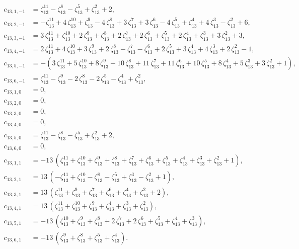 \documentclass[12pt]{amsart}
\theoremstyle{definition}
\theoremstyle{remark}
\numberwithin{equation}{section}
\begin{document}
\begin{align*}
c_{13,1,-1} &= \zeta_{13}^{11}-\zeta_{13}^{8}-\zeta_{13}^{5}+\zeta_{13}^{2}+2,
\\
c_{13,2,-1} &= -\zeta_{13}^{11}+4\, \zeta_{13}^{10}+\zeta_{13}^{9}-4\, \zeta_{13}^{8}+3\, \zeta_{13}^{7}+3\, \zeta_{13}^{6}-4\, \zeta_{13}^{5}+\zeta_{13}^{4}+4\, \zeta_{13}^{3}-\zeta_{13}^{2}+6,
\\
c_{13,3,-1} &= 3\, \zeta_{13}^{11}+\zeta_{13}^{10}+2\, \zeta_{13}^{9}+\zeta_{13}^{8}+2\, \zeta_{13}^{7}+2\, \zeta_{13}^{6}+\zeta_{13}^{5}+2\, \zeta_{13}^{4}+\zeta_{13}^{3}+3\, \zeta_{13}^{2}+3,
\\
c_{13,4,-1} &= 2\, \zeta_{13}^{11}+4\, \zeta_{13}^{10}+3\, \zeta_{13}^{9}+2\, \zeta_{13}^{8}-\zeta_{13}^{7}-\zeta_{13}^{6}+2\, \zeta_{13}^{5}+3\, \zeta_{13}^{4}+4\, \zeta_{13}^{3}+2\, \zeta_{13}^{2}-1,
\\
c_{13,5,-1} &= -(3\, \zeta_{13}^{11}+5\, \zeta_{13}^{10}+8\, \zeta_{13}^{9}+10\, \zeta_{13}^{8}+11\, \zeta_{13}^{7}+11\, \zeta_{13}^{6}+10\, \zeta_{13}^{5}+8\, \zeta_{13}^{4}+5\, \zeta_{13}^{3}+3\, \zeta_{13}^{2}+1),
\\
c_{13,6,-1} &= \zeta_{13}^{11}-\zeta_{13}^{9}-2\, \zeta_{13}^{8}-2\, \zeta_{13}^{5}-\zeta_{13}^{4}+\zeta_{13}^{2},
\\
c_{13,1,0} &= 0,
\\
c_{13,2,0} &= 0,
\\
c_{13,3,0} &= 0,
\\
c_{13,4,0} &= 0,
\\
c_{13,5,0} &= \zeta_{13}^{11}-\zeta_{13}^{8}-\zeta_{13}^{5}+\zeta_{13}^{2}+2,
\\
c_{13,6,0} &= 0,
\\
c_{13,1,1} &= -13\, (\zeta_{13}^{11}+\zeta_{13}^{10}+ \zeta_{13}^{9}+ \zeta_{13}^{8}+ \zeta_{13}^{7}+ \zeta_{13}^{6}+ \zeta_{13}^{5}+ \zeta_{13}^{4}+ \zeta_{13}^{3}+ \zeta_{13}^{2}+ 1),
\\
c_{13,2,1} &= 13\, (-\zeta_{13}^{11}+ \zeta_{13}^{10}- \zeta_{13}^{8}-\zeta_{13}^{5}+ \zeta_{13}^{3}- \zeta_{13}^{2}+1),
\\
c_{13,3,1} &= 13\, (\zeta_{13}^{11}+ \zeta_{13}^{9}+ \zeta_{13}^{7}+ \zeta_{13}^{6}+\zeta_{13}^{4}+ \zeta_{13}^{2}+2),
\\
c_{13,4,1} &= 13\, (\zeta_{13}^{11}+ \zeta_{13}^{10}+ \zeta_{13}^{9}+ \zeta_{13}^{4}+ \zeta_{13}^{3}+ \zeta_{13}^{2}),
\\
c_{13,5,1} &= -13\, (\zeta_{13}^{10}+\zeta_{13}^{9}+ \zeta_{13}^{8}+2\, \zeta_{13}^{7}+2\, \zeta_{13}^{6}+ \zeta_{13}^{5}+ \zeta_{13}^{4}+ \zeta_{13}^{3}),
\\
c_{13,6,1} &= -13\, (\zeta_{13}^{9}+\zeta_{13}^{8}+\zeta_{13}^{5}+\zeta_{13}^{4}).
\end{align*}
\end{document}
